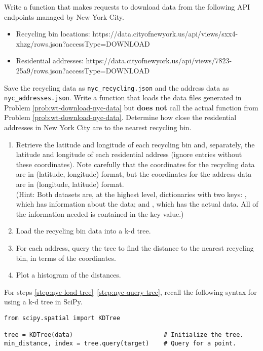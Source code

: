 Write a function that makes requests to download data from the following API endpoints managed by New York City.
{\scriptsize
\begin{itemize}
\item Recycling bin locations: https://data.cityofnewyork.us/api/views/sxx4-xhzg/rows.json?accessType=DOWNLOAD
\item Residential addresses: https://data.cityofnewyork.us/api/views/7823-25a9/rows.json?accessType=DOWNLOAD
\end{itemize}}
\noindent Save the recycling data as \texttt{nyc\_recycling.json} and the address data as \texttt{nyc\_addresses.json}.
\label{prob:wt-download-nyc-data}
Write a function that loads the data files generated in Problem \ref{prob:wt-download-nyc-data} but \textbf{does not} call the actual function from Problem \ref{prob:wt-download-nyc-data}.
Determine how close the residential addresses in New York City are to the nearest recycling bin.
\begin{enumerate}
\item Retrieve the latitude and longitude of each recycling bin and, separately, the latitude and longitude of each residential address (ignore entries without these coordinates).
Note carefully that the coordinates for the recycling data are in (latitude, longitude) format, but the coordinates for the address data are in (longitude, latitude) format.
\\(Hint: Both datasets are, at the highest level, dictionaries with two keys: , which has information about the data; and , which has the actual data.
All of the information needed is contained in the  key value.)
\item Load the recycling bin data into a k-d tree.
\label{step:nyc-load-tree}
\item For each address, query the tree to find the distance to the nearest recycling bin, in terms of the coordinates.
\label{step:nyc-query-tree}
\item Plot a histogram of the distances.
\end{enumerate}

For steps \ref{step:nyc-load-tree}--\ref{step:nyc-query-tree}, recall the following syntax for using a k-d tree in SciPy.
\begin{lstlisting}
from scipy.spatial import KDTree

tree = KDTree(data)                         # Initialize the tree.
min_distance, index = tree.query(target)    # Query for a point.
\end{lstlisting}
\label{prob:wt-analyze-nyc-data}

